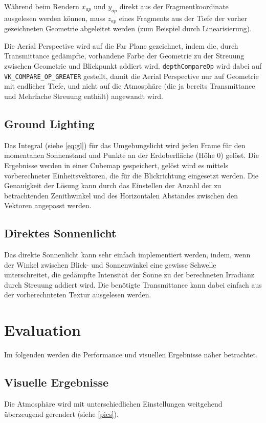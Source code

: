 Während beim Rendern $x_{ap}$ und $y_{ap}$ direkt aus der Fragmentkoordinate ausgelesen werden können, muss $z_{ap}$
eines Fragments aus der Tiefe der vorher gezeichneten Geometrie abgeleitet werden (zum Beispiel durch Linearisierung).

Die Aerial Perspective wird auf die Far Plane gezeichnet, indem die, durch Transmittance gedämpfte, vorhandene Farbe
der Geometrie zu der Streuung zwischen Geometrie und Blickpunkt addiert wird. \texttt{depthCompareOp} wird dabei auf
\texttt{VK\_COMPARE\_OP\_GREATER} gestellt, damit die Aerial Perspective nur auf Geometrie mit endlicher Tiefe, und
nicht auf die Atmosphäre (die ja bereits Transmittance und Mehrfache Streuung enthält) angewandt wird.

\subsection{Ground Lighting}
Das Integral (siehe \cref{eq:gl}) für das Umgebungslicht wird jeden Frame für den momentanen Sonnenstand und
Punkte an der Erdoberfläche (Höhe 0) gelöst. Die Ergebnisse werden in einer Cubemap gespeichert, gelöst wird es mittels
vorberechneter Einheitsvektoren, die für die Blickrichtung eingesetzt werden. Die Genauigkeit der Lösung kann durch das
Einstellen der Anzahl der zu betrachtenden Zenithwinkel und des Horizontalen Abstandes zwischen den Vektoren angepasst
werden.

\subsection{Direktes Sonnenlicht}
Das direkte Sonnenlicht kann sehr einfach implementiert werden, indem, wenn der Winkel zwischen Blick- und Sonnenwinkel
eine gewisse Schwelle unterschreitet, die gedämpfte Intensität der Sonne zu der berechneten Irradianz durch Streuung
addiert wird. Die benötigte Transmittance kann dabei einfach aus der vorberechnteten Textur ausgelesen werden.

\section{Evaluation}

Im folgenden werden die Performance und visuellen Ergebnisse näher betrachtet.

\subsection{Visuelle Ergebnisse}
Die Atmosphäre wird mit unterschiedlichen Einstellungen weitgehend überzeugend gerendert (siehe \cref{pics}).

